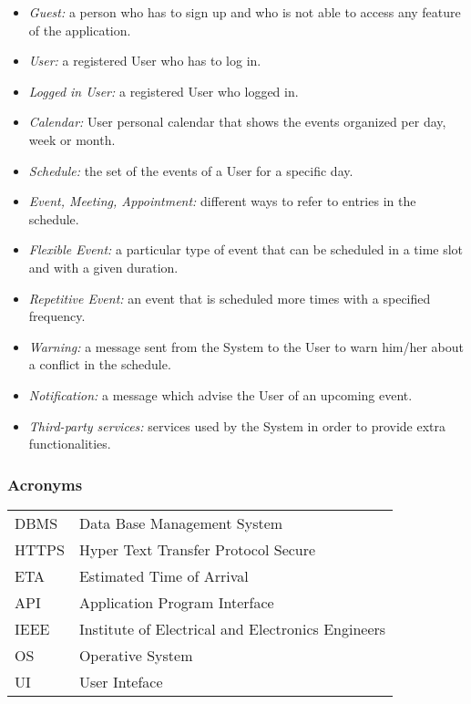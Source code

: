 \begin{itemize}
	\item \textit{Guest:} a person who has to sign up and who is not able to access any feature of the application.
	\item \textit{User:} a registered User who has to log in.
	\item \textit{Logged in User:} a registered User who logged in. 
	\item \textit{Calendar:} User personal calendar that shows the events organized per day, week or month.
	\item  \textit{Schedule:} the set of the events of a User for a specific day.
	\item \textit{Event, Meeting, Appointment:} different ways to refer to entries in the schedule.
	\item \textit{Flexible Event:} a particular type of event that can be scheduled in a time slot and with a given duration.
	\item \textit{Repetitive Event:} an event that is scheduled more times with a specified frequency.
	\item \textit{Warning:} a message sent from the System to the User to warn him/her about a conflict in the schedule.
	\item \textit{Notification:} a message which advise the User of an upcoming event.
	\item \textit{Third-party services:} services used by the System in order to provide extra functionalities.
\end{itemize}

\subsubsection{Acronyms}

\begin{center}
	\begin{tabular}{| l | l |}
		\hline
		DBMS & Data Base Management System\\
		HTTPS & Hyper Text Transfer Protocol Secure\\
		ETA & Estimated Time of Arrival \\
		API & Application Program Interface \\
		IEEE & Institute of Electrical and Electronics Engineers\\
		OS & Operative System\\
		UI & User Inteface\\
		\hline
	\end{tabular}
\end{center}

